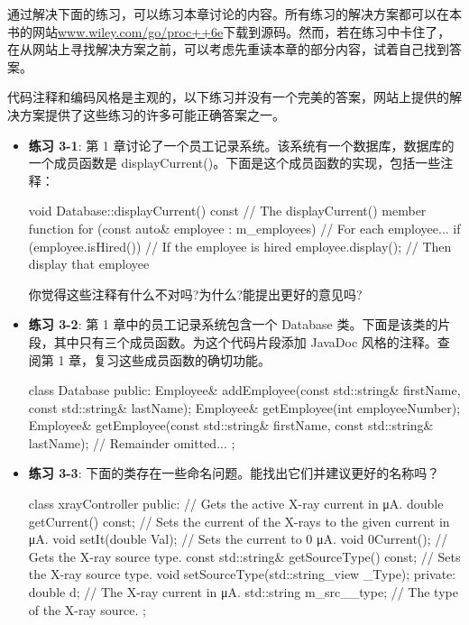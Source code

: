 通过解决下面的练习，可以练习本章讨论的内容。所有练习的解决方案都可以在本书的网站\url{www.wiley.com/go/proc++6e}下载到源码。然而，若在练习中卡住了，在从网站上寻找解决方案之前，可以考虑先重读本章的部分内容，试着自己找到答案。

代码注释和编码风格是主观的，以下练习并没有一个完美的答案，网站上提供的解决方案提供了这些练习的许多可能正确答案之一。

\begin{itemize}
\item
\textbf{练习 3-1}: 第 1 章讨论了一个员工记录系统。该系统有一个数据库，数据库的一个成员函数是 displayCurrent()。下面是这个成员函数的实现，包括一些注释：


\begin{cpp}
void Database::displayCurrent() const // The displayCurrent() member function
{
    for (const auto& employee : m_employees) { // For each employee...
        if (employee.isHired()) { // If the employee is hired
            employee.display(); // Then display that employee
        }
    }
}
\end{cpp}

你觉得这些注释有什么不对吗?为什么?能提出更好的意见吗?


\item
\textbf{练习 3-2}: 第 1 章中的员工记录系统包含一个 Database 类。下面是该类的片段，其中只有三个成员函数。为这个代码片段添加 JavaDoc 风格的注释。查阅第 1 章，复习这些成员函数的确切功能。

\begin{cpp}
class Database
{
    public:
    Employee& addEmployee(const std::string& firstName,
    const std::string& lastName);
    Employee& getEmployee(int employeeNumber);
    Employee& getEmployee(const std::string& firstName,
    const std::string& lastName);
    // Remainder omitted...
};
\end{cpp}

\item
\textbf{练习 3-3}: 下面的类存在一些命名问题。能找出它们并建议更好的名称吗？

\begin{cpp}
class xrayController
{
    public:
        // Gets the active X-ray current in μA.
        double getCurrent() const;
        // Sets the current of the X-rays to the given current in μA.
        void setIt(double Val);
        // Sets the current to 0 μA.
        void 0Current();
        // Gets the X-ray source type.
        const std::string& getSourceType() const;
        // Sets the X-ray source type.
        void setSourceType(std::string_view _Type);
    private:
        double d; // The X-ray current in μA.
        std::string m_src__type; // The type of the X-ray source.
};
\end{cpp}


\end{itemize}
